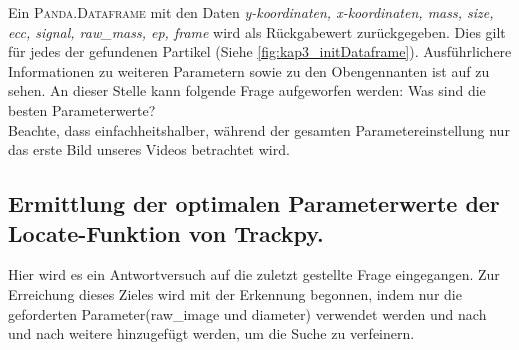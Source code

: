 		
Ein \textsc{Panda.Dataframe} mit den Daten \textit{y-koordinaten, x-koordinaten, mass, size, ecc, signal, raw\_mass, ep, frame} wird als Rückgabewert zurückgegeben. Dies gilt für jedes der gefundenen Partikel (Siehe \ref{fig:kap3_initDataframe}).
Ausführlichere Informationen zu  weiteren Parametern sowie zu den Obengennanten ist auf \cite{Tp} zu sehen.%
An dieser Stelle kann folgende Frage aufgeworfen werden: Was sind die besten Parameterwerte? \\
Beachte, dass einfachheitshalber, während der gesamten Parametereinstellung nur das erste Bild unseres Videos betrachtet wird.

	\subsection{Ermittlung der optimalen Parameterwerte der Locate-Funktion von Trackpy. \label{kap3_OP}}
	Hier wird es ein Antwortversuch auf die zuletzt gestellte Frage eingegangen. Zur Erreichung dieses Zieles wird mit der Erkennung begonnen, indem nur die geforderten Parameter(raw\_image und diameter) verwendet werden und nach und nach weitere hinzugefügt werden, um die Suche zu verfeinern. 
	
